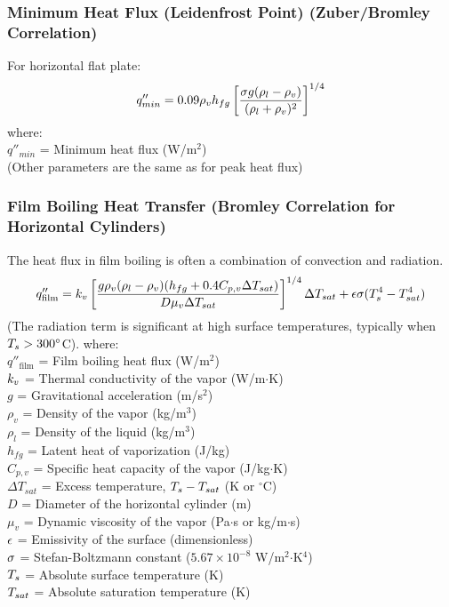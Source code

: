 \subsubsection*{Minimum Heat Flux (Leidenfrost Point) (Zuber/Bromley Correlation)}
For horizontal flat plate:
\begin{equation}
    q''_{min} = 0.09 \rho_v h_{fg} \left[ \frac{\sigma g (\rho_l - \rho_v)}{(\rho_l + \rho_v)^2} \right]^{1/4}
\end{equation}
where: \\
$q''_{min}$ = Minimum heat flux (W/m$^2$) \\
(Other parameters are the same as for peak heat flux)

\subsubsection*{Film Boiling Heat Transfer (Bromley Correlation for Horizontal Cylinders)}
The heat flux in film boiling is often a combination of convection and radiation.
\begin{equation}
    q''_{\text{film}} = k_v \left[ \frac{g \rho_v (\rho_l - \rho_v) (h_{fg} + 0.4 C_{p,v} \Delta T_{sat})}{D \mu_v \Delta T_{sat}} \right]^{1/4} \Delta T_{sat} + \epsilon \sigma (T_s^4 - T_{sat}^4)
\end{equation}
(The radiation term is significant at high surface temperatures, typically when $T_s > 300^\circ$C).
where: \\
$q''_{\text{film}}$ = Film boiling heat flux (W/m$^2$) \\
$k_v$ = Thermal conductivity of the vapor (W/m$\cdot$K) \\
$g$ = Gravitational acceleration (m/s$^2$) \\
$\rho_v$ = Density of the vapor (kg/m$^3$) \\
$\rho_l$ = Density of the liquid (kg/m$^3$) \\
$h_{fg}$ = Latent heat of vaporization (J/kg) \\
$C_{p,v}$ = Specific heat capacity of the vapor (J/kg$\cdot$K) \\
$\Delta T_{sat}$ = Excess temperature, $T_s - T_{sat}$ (K or $^\circ$C) \\
$D$ = Diameter of the horizontal cylinder (m) \\
$\mu_v$ = Dynamic viscosity of the vapor (Pa$\cdot$s or kg/m$\cdot$s) \\
$\epsilon$ = Emissivity of the surface (dimensionless) \\
$\sigma$ = Stefan-Boltzmann constant ($5.67 \times 10^{-8}$ W/m$^2$$\cdot$K$^4$) \\
$T_s$ = Absolute surface temperature (K) \\
$T_{sat}$ = Absolute saturation temperature (K)

